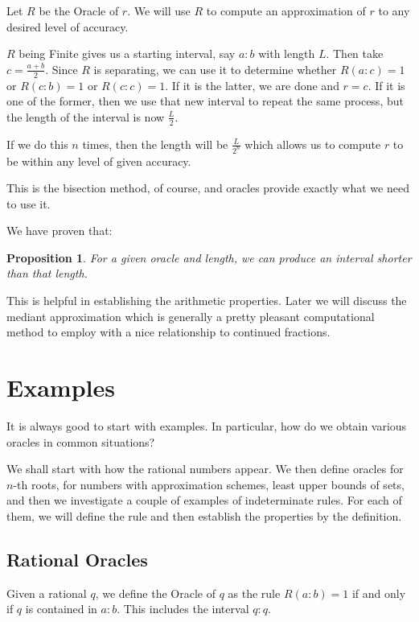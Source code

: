 \documentclass[12pt]{article}
\newtheorem{proposition}{Proposition}
\theoremstyle{remark}
\begin{document}
Let $R$ be the Oracle of $r$. We will use $R$ to compute an approximation of $r$ to any desired level of accuracy. 

$R$ being Finite gives us a starting interval, say $a:b$ with length $L$. Then take $c = \frac{a+b}{2}$. Since $R$ is separating, we can use it to determine whether $R(a:c) = 1$ or $R(c:b) = 1$ or $R(c:c) = 1$. If it is the latter, we are done and $r = c$. If it is one of the former, then we use that new interval to repeat the same process, but the length of the interval is now $\frac{L}{2}$. 

If we do this $n$ times, then the length will be $\frac{L}{2^n}$ which allows us to compute $r$ to be within any level of given accuracy. 

This is the bisection method, of course, and oracles provide exactly what we need to use it. 

We have proven that: 

\begin{proposition}\label{pr:short}
For a given oracle and length, we can produce an interval shorter than that length. 
\end{proposition}

This is helpful in establishing the arithmetic properties. Later we will discuss the mediant approximation which is generally a pretty pleasant computational method to employ with a nice relationship to continued fractions. 


\section{Examples}

It is always good to start with examples. In particular, how do we obtain various oracles in common situations? 

We shall start with how the rational numbers appear. We then define oracles for $n$-th roots, for numbers with approximation schemes, least upper bounds of sets, and then we investigate a couple of examples of indeterminate rules. For each of them, we will define the rule and then establish the properties by the definition. 

\subsection{Rational Oracles}

Given a rational $q$, we define the Oracle of $q$ as the rule $R(a:b) = 1$ if and only if $q$ is contained in $a:b$. This includes the interval $q:q$.  
\end{document}
